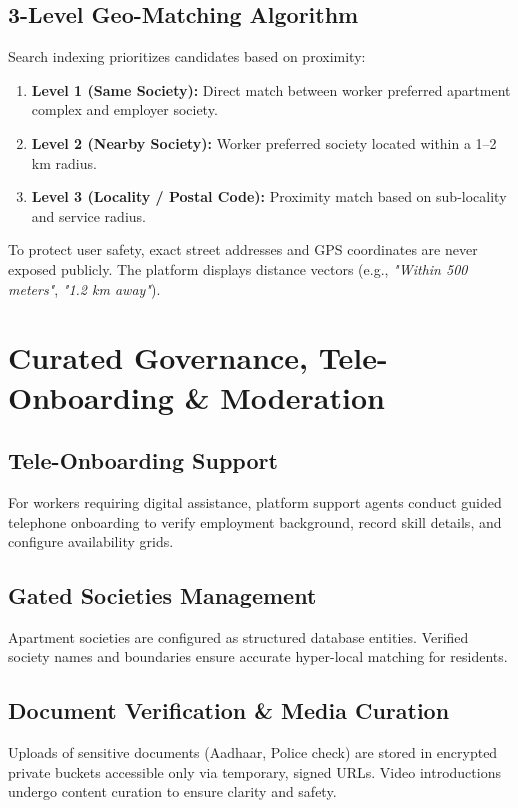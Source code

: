 \documentclass[11pt,a4paper]{article}
\begin{document}
\subsection{3-Level Geo-Matching Algorithm}
Search indexing prioritizes candidates based on proximity:
\begin{enumerate}
    \item \textbf{Level 1 (Same Society):} Direct match between worker preferred apartment complex and employer society.
    \item \textbf{Level 2 (Nearby Society):} Worker preferred society located within a 1--2 km radius.
    \item \textbf{Level 3 (Locality / Postal Code):} Proximity match based on sub-locality and service radius.
\end{enumerate}

\begin{tcolorbox}[colback=gray!5white,colframe=gray!50white,title=\textbf{Location Privacy Shield}]
To protect user safety, exact street addresses and GPS coordinates are never exposed publicly. The platform displays distance vectors (e.g., \textit{"Within 500 meters"}, \textit{"1.2 km away"}).
\end{tcolorbox}

\section{Curated Governance, Tele-Onboarding \& Moderation}

\subsection{Tele-Onboarding Support}
For workers requiring digital assistance, platform support agents conduct guided telephone onboarding to verify employment background, record skill details, and configure availability grids.

\subsection{Gated Societies Management}
Apartment societies are configured as structured database entities. Verified society names and boundaries ensure accurate hyper-local matching for residents.

\subsection{Document Verification \& Media Curation}
Uploads of sensitive documents (Aadhaar, Police check) are stored in encrypted private buckets accessible only via temporary, signed URLs. Video introductions undergo content curation to ensure clarity and safety.
\end{document}
